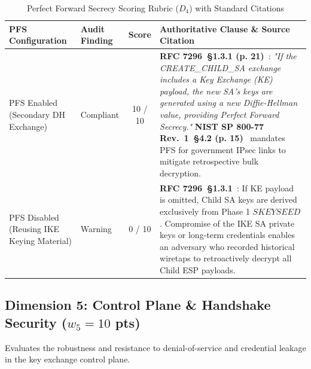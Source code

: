 \documentclass[11pt,a4paper]{article}
\begin{document}
\begin{table}[h!]
\centering
\small
\begin{tabularx}{\textwidth}{llcX}
\toprule
\textbf{PFS Configuration} & \textbf{Audit Finding} & \textbf{Score} & \textbf{Authoritative Clause \& Source Citation} \\
\midrule
PFS Enabled (Secondary DH Exchange) & Compliant & 10 / 10 & \textbf{RFC 7296~\S 1.3.1 (p. 21)}~\cite{rfc7296}: \textit{"If the CREATE\_CHILD\_SA exchange includes a Key Exchange (KE) payload, the new SA's keys are generated using a new Diffie-Hellman value, providing Perfect Forward Secrecy."} \textbf{NIST SP 800-77 Rev.~1~\S 4.2 (p. 15)}~\cite{nist800-77r1} mandates PFS for government IPsec links to mitigate retrospective bulk decryption. \\
\addlinespace
PFS Disabled (Reusing IKE Keying Material) & Warning & 0 / 10 & \textbf{RFC 7296~\S 1.3.1}~\cite{rfc7296}: If KE payload is omitted, Child SA keys are derived exclusively from Phase 1 $SKEYSEED$. Compromise of the IKE SA private keys or long-term credentials enables an adversary who recorded historical wiretaps to retroactively decrypt all Child ESP payloads. \\
\bottomrule
\end{tabularx}
\caption{Perfect Forward Secrecy Scoring Rubric ($D_4$) with Standard Citations}
\label{tab:d4}
\end{table}

\subsection{Dimension 5: Control Plane \& Handshake Security ($w_5 = 10$ pts)}
Evaluates the robustness and resistance to denial-of-service and credential leakage in the key exchange control plane.
\end{document}

